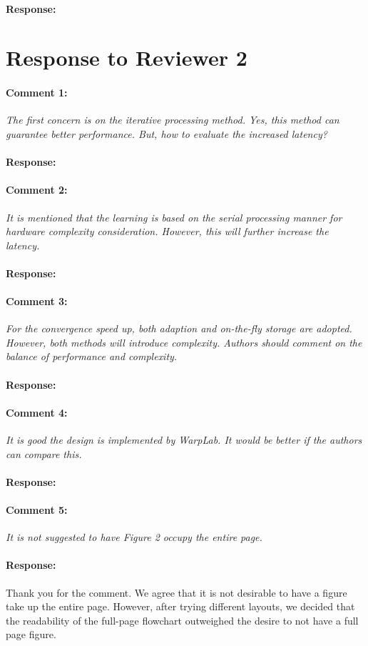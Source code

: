 \documentclass[]{article}
\begin{document}
\paragraph{Response:}
	

\section{Response to Reviewer 2}
\paragraph{Comment 1:}\textit{The first concern is on the iterative processing method. Yes, this method can guarantee better performance. But, how to evaluate the increased latency?}
\paragraph{Response:}

\paragraph{Comment 2:}\textit{It is mentioned that the learning is based on the serial processing manner for hardware complexity consideration. However, this will further increase the latency.}
\paragraph{Response:}
	
\paragraph{Comment 3:}\textit{For the convergence speed up, both adaption and on-the-fly storage are adopted. However, both methods will introduce complexity. Authors should comment on the balance of performance and complexity.}
\paragraph{Response:}
	
\paragraph{Comment 4:}\textit{It is good the design is implemented by WarpLab. It would be better if the authors can compare this.}
\paragraph{Response:}
\paragraph{Comment 5:}\textit{It is not suggested to have Figure 2 occupy the entire page.}
\paragraph{Response:}
Thank you for the comment. We agree that it is not desirable to have a figure take up the entire page. However, after trying different layouts, we decided that the readability of the full-page flowchart outweighed the desire to not have a full page figure. 
\end{document}
